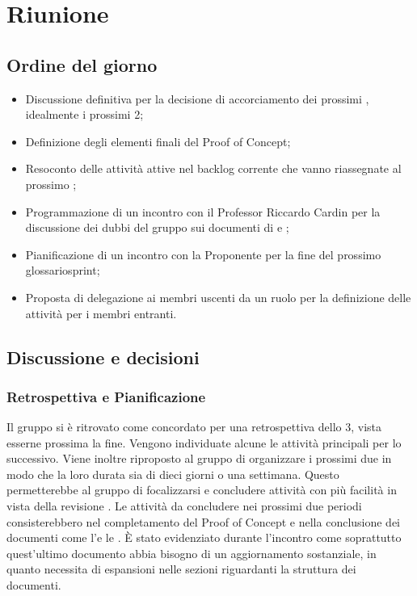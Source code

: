 \section{Riunione}
\subsection{Ordine del giorno}
\begin{itemize}
	\item Discussione definitiva per la decisione di accorciamento dei prossimi , idealmente i prossimi 2;
	\item Definizione degli elementi finali del Proof of Concept;
	\item Resoconto delle attività attive nel backlog corrente che vanno riassegnate al prossimo ;
	\item Programmazione di un incontro con il Professor Riccardo Cardin per la discussione dei dubbi del gruppo sui documenti di \AdR e \PdQ;
	\item Pianificazione di un incontro con la Proponente per la fine del prossimo glossario{sprint};
	\item Proposta di delegazione ai membri uscenti da un ruolo per la definizione delle attività per i membri entranti.
\end{itemize}

\subsection{Discussione e decisioni}
\subsubsection{Retrospettiva e Pianificazione}
\par Il gruppo si è ritrovato come concordato per una retrospettiva dello  3, vista esserne prossima la fine. Vengono individuate alcune le attività principali per lo  successivo. 
Viene inoltre riproposto al gruppo di organizzare i prossimi due  in modo che la loro durata sia di dieci giorni o una settimana. 
Questo permetterebbe al gruppo di focalizzarsi e concludere attività con più facilità in vista della revisione \RTB.
Le attività da concludere nei prossimi due periodi consisterebbero nel completamento del Proof of Concept e nella conclusione dei documenti come l'\AdR e le \NdP.
È stato evidenziato durante l'incontro come soprattutto quest'ultimo documento abbia bisogno di un aggiornamento sostanziale, in quanto necessita di espansioni nelle sezioni riguardanti la struttura dei documenti.

